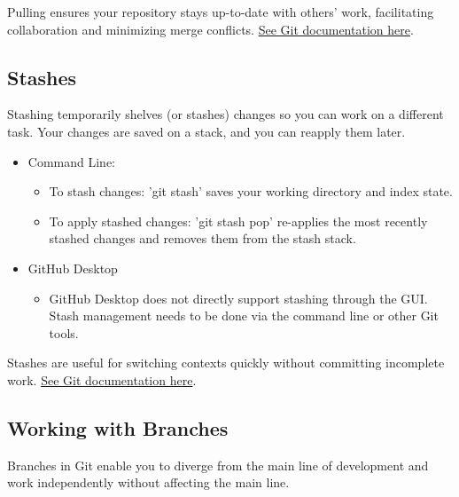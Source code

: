 \documentclass[10pt,twocolumn]{article}
\begin{document}
Pulling ensures your repository stays up-to-date with others' work, facilitating collaboration and minimizing merge conflicts. \hyperlink{https://git-scm.com/docs/git-pull}{See Git documentation here}. \cite{GitPullDocumentation}\cite{GitGuidesPull}

\subsection{Stashes}

Stashing temporarily shelves (or stashes) changes so you can work on a different task. Your changes are saved on a stack, and you can reapply them later.

\begin{itemize}
    \item Command Line: 
    \begin{itemize}
        \item To stash changes: 'git stash' saves your working directory and index state.
        \item To apply stashed changes: 'git stash pop' re-applies the most recently stashed changes and removes them from the stash stack.
    \end{itemize}
    \item GitHub Desktop
    \begin{itemize}
        \item GitHub Desktop does not directly support stashing through the GUI. Stash management needs to be done via the command line or other Git tools.
    \end{itemize}
    
\end{itemize}

Stashes are useful for switching contexts quickly without committing incomplete work. \hyperlink{https://git-scm.com/docs/git-stash}{See Git documentation here}. \cite{GitPullDocumentation}

\subsection{Working with Branches}

Branches in Git enable you to diverge from the main line of development and work independently without affecting the main line.
\end{document}

